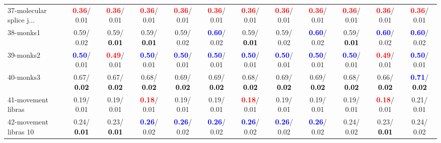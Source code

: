 \begin{table}[h]
\begin{center}
{\begin{tabular}{lc|c|c|c|c|c|c|c|c|c|c}
37-molecular splice j... & \textcolor{red}{\textbf{  0.36}}/  0.01 & \textcolor{red}{\textbf{  0.36}}/  0.01 & \textcolor{red}{\textbf{  0.36}}/  0.01 & \textcolor{red}{\textbf{  0.36}}/  0.01 & \textcolor{red}{\textbf{  0.36}}/  0.01 & \textcolor{red}{\textbf{  0.36}}/  0.01 & \textcolor{red}{\textbf{  0.36}}/  0.01 & \textcolor{red}{\textbf{  0.36}}/  0.01 & \textcolor{red}{\textbf{  0.36}}/  0.01 & \textcolor{red}{\textbf{  0.36}}/  0.01 & \textcolor{red}{\textbf{  0.36}}/  0.01 \\
38-monks1 &   0.59/  0.02 &   0.59/\textcolor{black}{\textbf{  0.01}} &   0.59/\textcolor{black}{\textbf{  0.01}} &   0.59/  0.02 & \textcolor{blue}{\textbf{  0.60}}/  0.02 &   0.59/\textcolor{black}{\textbf{  0.01}} &   0.59/  0.02 & \textcolor{blue}{\textbf{  0.60}}/  0.02 &   0.59/\textcolor{black}{\textbf{  0.01}} & \textcolor{blue}{\textbf{  0.60}}/  0.02 & \textcolor{blue}{\textbf{  0.60}}/  0.02 \\
39-monks2 & \textcolor{blue}{\textbf{  0.50}}/  0.01 & \textcolor{red}{\textbf{  0.49}}/  0.01 & \textcolor{blue}{\textbf{  0.50}}/  0.01 & \textcolor{blue}{\textbf{  0.50}}/  0.01 & \textcolor{blue}{\textbf{  0.50}}/  0.01 & \textcolor{blue}{\textbf{  0.50}}/  0.01 & \textcolor{blue}{\textbf{  0.50}}/  0.01 & \textcolor{blue}{\textbf{  0.50}}/  0.01 & \textcolor{blue}{\textbf{  0.50}}/  0.01 & \textcolor{red}{\textbf{  0.49}}/  0.01 & \textcolor{blue}{\textbf{  0.50}}/  0.01 \\ \hline
40-monks3 &   0.67/\textcolor{black}{\textbf{  0.02}} &   0.67/\textcolor{black}{\textbf{  0.02}} &   0.68/\textcolor{black}{\textbf{  0.02}} &   0.69/\textcolor{black}{\textbf{  0.02}} &   0.69/\textcolor{black}{\textbf{  0.02}} &   0.68/\textcolor{black}{\textbf{  0.02}} &   0.69/\textcolor{black}{\textbf{  0.02}} &   0.69/\textcolor{black}{\textbf{  0.02}} &   0.68/\textcolor{black}{\textbf{  0.02}} &   0.66/\textcolor{black}{\textbf{  0.02}} & \textcolor{blue}{\textbf{  0.71}}/\textcolor{black}{\textbf{  0.02}} \\
41-movement libras &   0.19/  0.01 &   0.19/  0.01 & \textcolor{red}{\textbf{  0.18}}/  0.01 &   0.19/  0.01 &   0.19/  0.01 & \textcolor{red}{\textbf{  0.18}}/  0.01 &   0.19/  0.01 &   0.19/  0.01 &   0.19/  0.01 & \textcolor{red}{\textbf{  0.18}}/  0.01 &   0.21/  0.01 \\
42-movement libras 10 &   0.24/\textcolor{black}{\textbf{  0.01}} &   0.23/\textcolor{black}{\textbf{  0.01}} & \textcolor{blue}{\textbf{  0.26}}/  0.02 & \textcolor{blue}{\textbf{  0.26}}/  0.02 & \textcolor{blue}{\textbf{  0.26}}/  0.02 & \textcolor{blue}{\textbf{  0.26}}/  0.02 & \textcolor{blue}{\textbf{  0.26}}/  0.02 & \textcolor{blue}{\textbf{  0.26}}/  0.02 &   0.24/  0.02 &   0.23/\textcolor{black}{\textbf{  0.01}} &   0.24/  0.02 \\

\end{tabular}}
\end{center}
\end{table}
